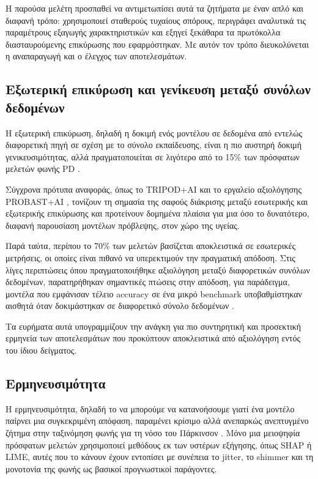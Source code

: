H παρούσα μελέτη προσπαθεί να αντιμετωπίσει αυτά τα ζητήματα με έναν απλό και διαφανή τρόπο: χρησιμοποιεί σταθερούς τυχαίους σπόρους, περιγράφει αναλυτικά τις παραμέτρους εξαγωγής χαρακτηριστικών και εξηγεί ξεκάθαρα τα πρωτόκολλα διασταυρούμενης επικύρωσης που εφαρμόστηκαν.
Με αυτόν τον τρόπο διευκολύνεται η αναπαραγωγή και ο έλεγχος των αποτελεσμάτων.

\subsection{Εξωτερική επικύρωση και γενίκευση μεταξύ συνόλων δεδομένων}
\label{sec:external-validation}

Η εξωτερική επικύρωση, δηλαδή η δοκιμή ενός μοντέλου σε δεδομένα από εντελώς διαφορετική πηγή σε σχέση με το σύνολο εκπαίδευσης, 
είναι η πιο αυστηρή δοκιμή γενικευσιμότητας, αλλά πραγματοποιείται σε λιγότερο από το 15\% των πρόσφατων μελετών φωνής PD \citep{sedigh_malekroodi2025voice}. 

Σύγχρονα πρότυπα αναφοράς, όπως το TRIPOD+AI \citep{collins2024tripod} και το εργαλείο αξιολόγησης PROBAST+AI \citep{moons2025probast}, 
τονίζουν τη σημασία της σαφούς διάκρισης μεταξύ εσωτερικής και εξωτερικής επικύρωσης και προτείνουν δομημένα πλαίσια για μια όσο το δυνατότερο, διαφανή παρουσίαση μοντέλων πρόβλεψης, στον χώρο της υγείας. 

Παρά ταύτα, περίπου το 70\% των μελετών βασίζεται αποκλειστικά σε εσωτερικές μετρήσεις, οι οποίες είναι πιθανό να υπερεκτιμούν την πραγματική απόδοση. 
Στις λίγες περιπτώσεις όπου πραγματοποιήθηκε αξιολόγηση μεταξύ διαφορετικών συνόλων δεδομένων, παρατηρήθηκαν σημαντικές πτώσεις στην απόδοση, 
για παράδειγμα, μοντέλα που εμφάνισαν τέλειο accuracy σε ένα μικρό benchmark υποβαθμίστηκαν αισθητά όταν δοκιμάστηκαν σε διαφορετικό σύνολο δεδομένων \citep{sedigh_malekroodi2025voice}.

Τα ευρήματα αυτά υπογραμμίζουν την ανάγκη για πιο συντηρητική και προσεκτική ερμηνεία των αποτελεσμάτων που προκύπτουν αποκλειστικά από αξιολόγηση εντός του ίδιου δείγματος.

\subsection{Ερμηνευσιμότητα}
\label{sec:interpretability-gap}

Η ερμηνευσιμότητα, δηλαδή το να μπορούμε να κατανοήσουμε γιατί ένα μοντέλο παίρνει μια συγκεκριμένη απόφαση, 
παραμένει κρίσιμο αλλά ανεπαρκώς ανεπτυγμένο ζήτημα στην ταξινόμηση φωνής για τη νόσο του Πάρκινσον \citep{sedigh_malekroodi2025voice}. 
Μόνο μια μειοψηφία πρόσφατων μελετών χρησιμοποιεί μεθόδους εκ των υστέρων εξήγησης, όπως SHAP ή LIME, αυτές που το κάνουν έχουν εντοπίσει με συνέπεια το \gls{jitter}, το \gls{shimmer} 
και τη μονοτονία της φωνής ως βασικοί προγνωστικοί παράγοντες. 

